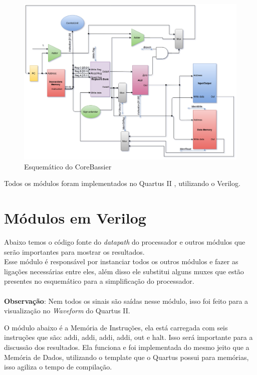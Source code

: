 \documentclass[
	12pt,
	openright,
	a4paper,
	english,			
	french,				
	spanish,			
	brazil,				
	]{abntex2}
\begin{document}
\begin{landscape}
\begin{figure}[H]
\centering 
\caption{Esquemático do CoreBassier} \label{fig:esquematico2}
\includegraphics[scale=0.5]{LABAOC.png}
\end{figure}
\end{landscape}

Todos os módulos foram implementados no Quartus II \cite{q2}, utilizando o Verilog.\\

\section{Módulos em Verilog}
Abaixo temos o código fonte do \emph{datapath} do processador e outros módulos que serão importantes para mostrar os resultados.\\
Esse módulo é responsável por instanciar todos os outros módulos e fazer as ligações necessárias entre eles,
além disso ele substitui alguns muxes que estão presentes no esquemático para a
simplificação do processador.\\\\
\textbf{Observação}: Nem todos os sinais são saídas nesse módulo, isso foi feito para a visualização no \emph{Waveform} do Quartus II.

\label{code:main.v}
 

O módulo abaixo é a Memória de Instruções, ela está carregada com seis instruções que são: addi, addi, addi, addi, out e halt.
Isso será importante para a discussão dos resultados.
Ela funciona e foi implementada do mesmo jeito que a Memória de Dados, utilizando o template que o Quartus possui para memórias, 
isso agiliza o tempo de compilação.
\end{document}
